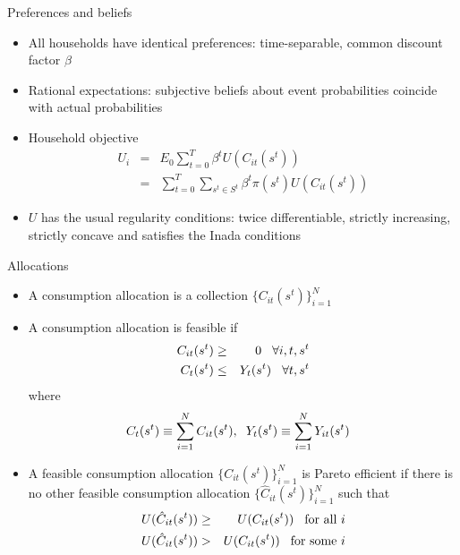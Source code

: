 \documentclass[9pt]{beamer}
\newcommand{\bit}{\begin{itemize}}
\newcommand{\eit}{\end{itemize}}
\begin{document}
\begin{frame}{Preferences and beliefs}

\bit
\setlength\itemsep{1em}

\item All households have identical preferences: time-separable, common discount factor $\beta$

\item Rational expectations: subjective beliefs about event probabilities coincide with actual probabilities

\item Household objective
\begin{eqnarray} 
U_{i} &=& E_{0} \sum_{t=0}^{T} \beta^t U(C_{it}(s^t)) \nonumber \\
&=& \sum_{t=0}^{T} \sum_{s^t \in S^t} \beta^t \pi (s^t) U(C_{it}(s^t)) \nonumber
\end{eqnarray}

\item $U$ has the usual regularity conditions: twice differentiable, strictly increasing, strictly concave and satisfies the Inada conditions

\eit

\end{frame}

\begin{frame}{Allocations}

\bit
\setlength\itemsep{1em}

\item A consumption allocation is a collection $\{C_{it}(s^t)\}_{i=1}^N$

\item A consumption allocation is feasible if
\begin{eqnarray}
C_{it}(s^t) &\geq& 0 \hspace{3mm} \forall i,t,s^t \nonumber \\
C_t(s^t)  &\leq& Y_t(s^t) \hspace{3mm}  \forall t,s^t \nonumber
\end{eqnarray}
where
\begin{eqnarray}
C_t(s^t) \equiv \sum_{i=1}^{N} C_{it}(s^t), \hspace{2mm} Y_t(s^t) \equiv \sum_{i=1}^{N} Y_{it}(s^t) \hspace{3mm} \nonumber
\end{eqnarray}

\item A feasible consumption allocation $\{C_{it}(s^t)\}_{i=1}^N$ is Pareto efficient if there is no other feasible consumption allocation $\{\hat C_{it}(s^t)\}_{i=1}^N$ such that
\begin{eqnarray}
U(\hat C_{it}(s^t)) &\geq& U(C_{it}(s^t)) \hspace{3mm} \text{for all } i\nonumber \\
U(\hat C_{it}(s^t)) &>& U(C_{it}(s^t)) \hspace{3mm} \text{for some } i\nonumber
\end{eqnarray}

\eit

\end{frame}
\end{document}

